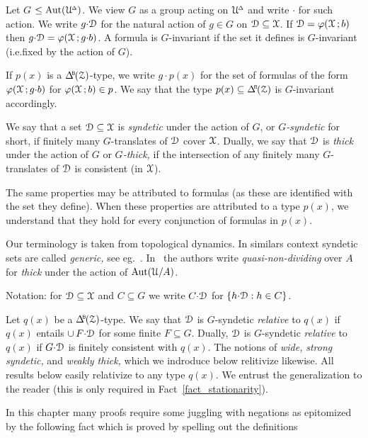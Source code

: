 Let \emph{$G$\/} $\le{\rm Aut}(\EuScript U\kern-.2ex^{\scriptscriptstyle\Delta})$.
We view $G$ as a group acting on $\EuScript U\kern-.2ex^{\scriptscriptstyle\Delta}$ and write ${\cdot}$ for such action.
We write $g{\cdot}\EuScript D$ for the natural action of $g\in G$ on $\EuScript D\subseteq\EuScript X$.
If $\EuScript D=\varphi(\EuScript X\,;b)$ then $g{\cdot}\EuScript D=\varphi(\EuScript X\,;g{\cdot}b)$.
A formula is $G$-invariant if the set it defines is $G$-invariant (i.e.\@ fixed by the action of $G$).

If $p(x)$ is a $\BDelta(\Z)$-type, we write $g{\cdot}p(x)$ for the set of formulas of the form $\varphi(\EuScript X\,;g{\cdot}b)$ for $\varphi(\EuScript X\,;b)\in p$.
We say that the type $p(x)\subseteq\BDelta(\Z)$ is $G$-invariant accordingly.

We say that a set $\EuScript D\subseteq\EuScript X$ is \emph{syndetic\/} under the action of $G$, or \emph{$G$-syndetic\/} for short, if finitely many $G$-translates of $\EuScript D$ cover $\EuScript X$.
Dually, we say that $\EuScript D$ is \emph{thick\/} under the action of $G$ or \emph{$G$-thick,} if the intersection of any finitely many $G$-translates of $\EuScript D$ is consistent (in $\EuScript X$).

The same properties may be attributed to formulas (as these are identified with the set they define).
When these properties are attributed to a type $p(x)$, we understand that they hold for every conjunction of formulas in $p(x)$.

Our terminology is taken from topological dynamics.
In similars context syndetic sets are called \textit{generic,} see eg.~\cite{Ne}.
In~\cite{CK} the authors write \textit{quasi-non-dividing\/} over $A$ for \textit{thick\/} under the action of ${\rm Aut}(\EuScript U/A)$.

Notation: for $\EuScript D\subseteq\EuScript X$ and $C\subseteq G$ we write \emph{$C{\cdot}\EuScript D$\/} for $\{h{\cdot}\EuScript D: h\in C\}$.

\begin{remark}\label{rem_relative}
Let $q(x)$ be a $\BDelta(\Z)$-type.
We say that $\EuScript D$ is $G$-syndetic \emph{relative\/} to $q(x)$ if $q(x)$ entails $\cup\,F{\cdot}\EuScript D$ for some finite $F\subseteq G$.
Dually, $\EuScript D$ is $G$-syndetic \emph{relative\/} to $q(x)$ if $G{\cdot}\EuScript D$ is finitely consistent with $q(x)$.
The notions of \textit{wide,\/} \textit{strong syndetic,\/} and \textit{weakly thick,\/}  which we indroduce below relitivize likewise.
All results below easily relativize to any type $q(x)$.
We entrust the generalization to the reader (this is only required in Fact~\ref{fact_stationarity}).
\end{remark}

In this chapter many proofs require some juggling with negations as epitomized by the following fact which is proved by spelling out the definitions

